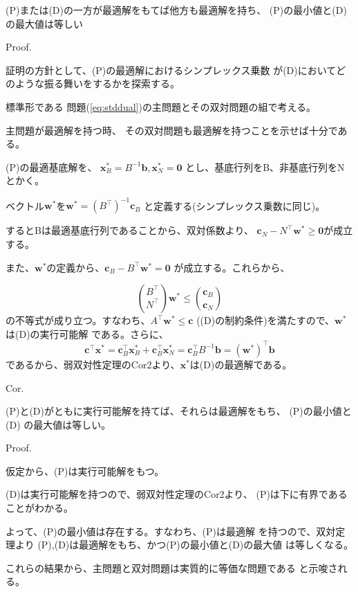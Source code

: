\documentclass[9pt]{ltjsreport}
\begin{document}
\begin{tcolorbox}[title=双対定理]
(P)または(D)の一方が最適解をもてば他方も最適解を持ち、
(P)の最小値と(D)の最大値は等しい

\hrulefill

Proof.

証明の方針として、(P)の最適解におけるシンプレックス乗数
が(D)においてどのような振る舞いをするかを探索する。

標準形である
問題(\ref{eq:stddual})の主問題とその双対問題の組で考える。

主問題が最適解を持つ時、
その双対問題も最適解を持つことを示せば十分である。

(P)の最適基底解を、
$\bm{x}^*_B=B^{-1}\bm{b},\bm{x}^*_N=\bm{0}$
とし、基底行列をB、非基底行列をNとかく。

ベクトル$\bm{w}^*$を$\bm{w}^*=(B^\top)^{-1}\bm{c}_B$
と定義する(シンプレックス乗数に同じ)。

するとBは最適基底行列であることから、双対係数より、
$\bm{c}_N-N^\top\bm{w}^*\ge\bm{0}$が成立する。

また、$\bm{w}^*$の定義から、$\bm{c}_B-B^\top\bm{w}^*=\bm{0}$
が成立する。これらから、

\begin{equation*}
\binom{B^\top}{N^\top}\bm{w}^*
\le\binom{\bm{c}_B}{\bm{c}_N}
\end{equation*}
の不等式が成り立つ。すなわち、$A^\top\bm{w}^*\le\bm{c}$
((D)の制約条件)を満たすので、$\bm{w}^*$は(D)の実行可能解
である。さらに、
\begin{equation*}
    \bm{c}^\top\bm{x}^*
    =\bm{c}_B^\top\bm{x}_B^*+\bm{c}_B^\top\bm{x}_N^*
    =\bm{c}_B^\top B^{-1}\bm{b}=(\bm{w}^*)^\top\bm{b}
\end{equation*}
であるから、弱双対性定理のCor2より、$\bm{x}^*$は(D)の最適解である。

\hrulefill

Cor.

(P)と(D)がともに実行可能解を持てば、それらは最適解をもち、
(P)の最小値と(D)
の最大値は等しい。

\hrulefill

Proof.

仮定から、(P)は実行可能解をもつ。

(D)は実行可能解を持つので、弱双対性定理のCor2より、
(P)は下に有界であることがわかる。

よって、(P)の最小値は存在する。すなわち、(P)は最適解
を持つので、双対定理より
(P),(D)は最適解をもち、かつ(P)の最小値と(D)の最大値
は等しくなる。

\end{tcolorbox}
これらの結果から、主問題と双対問題は実質的に等価な問題である
と示唆される。
\end{document}
